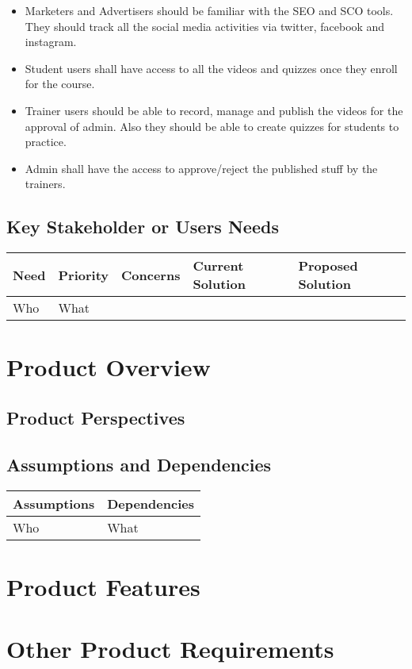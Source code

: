 \documentclass{article}
\begin{document}
\begin{itemize}
    \item Marketers and Advertisers should be familiar with the SEO and SCO tools. They should track all the social media activities via twitter, facebook and instagram.
    \item Student users shall have access to all the videos and quizzes once they enroll for the course.
    \item Trainer users should be able to record, manage and publish the videos for the approval of admin. Also they should be able to create quizzes for students to practice.
    \item Admin shall have the access to approve/reject the published stuff by the trainers.
\end{itemize}

\subsection{Key Stakeholder or Users Needs}


\begin{tabular}{|p{2.5cm}|p{2.5cm}|p{3.5cm}|p{3.5cm}|p{3.5cm}|}
\hline
\textbf{Need} & \textbf{Priority} & \textbf{Concerns} & \textbf{Current Solution} & \textbf{Proposed Solution}\\ \hline
Who & What & & &\\ \hline

\end{tabular}


\section{Product Overview}

\subsection{Product Perspectives}

\subsection{Assumptions and Dependencies}

\begin{tabular}{|p{5.5cm}|p{6.5cm}|}
\hline
\textbf{Assumptions} & \textbf{Dependencies} \\ \hline
Who & What\\ \hline

\end{tabular}



\section{Product Features}

\section{Other Product Requirements}
\end{document}
